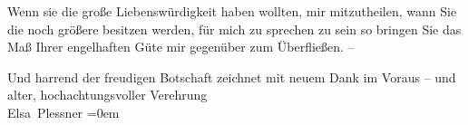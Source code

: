 \pstart
           Wenn sie die große Liebenswürdigkeit haben wollten, mir mitzutheilen, wann Sie die
               noch größere besitzen {\pb}werden, für mich zu sprechen zu sein so bringen
               Sie das Maß Ihrer engelhaften Güte mir gegenüber zum Überfließen. –\pend
           
\pstart
           Und harrend der freudigen Botschaft zeichnet mit neuem Dank im Voraus – und
               alter, hochachtungsvoller Verehrung{\\[\baselineskip]}\spacefill\mbox{Elsa Plessner}\pend
           \leftskip=0em{}\endnumbering{}
\begin{anhang}
\end{anhang}
      